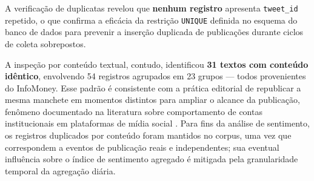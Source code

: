 A verificação de duplicatas revelou que \textbf{nenhum registro} apresenta \texttt{tweet\_id} repetido, o que confirma a eficácia da restrição \texttt{UNIQUE} definida no esquema do banco de dados para prevenir a inserção duplicada de publicações durante ciclos de coleta sobrepostos.

A inspeção por conteúdo textual, contudo, identificou \textbf{31 textos com conteúdo idêntico}, envolvendo 54 registros agrupados em 23 grupos — todos provenientes do InfoMoney. Esse padrão é consistente com a prática editorial de republicar a mesma manchete em momentos distintos para ampliar o alcance da publicação, fenômeno documentado na literatura sobre comportamento de contas institucionais em plataformas de mídia social \cite{santana2024cap34}. Para fins da análise de sentimento, os registros duplicados por conteúdo foram mantidos no corpus, uma vez que correspondem a eventos de publicação reais e independentes; sua eventual influência sobre o índice de sentimento agregado é mitigada pela granularidade temporal da agregação diária.
